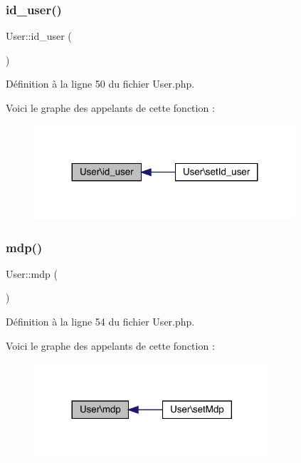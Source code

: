 \subsubsection{\texorpdfstring{id\+\_\+user()}{id\_user()}}
{\footnotesize\ttfamily User\+::id\+\_\+user (\begin{DoxyParamCaption}{ }\end{DoxyParamCaption})}



Définition à la ligne 50 du fichier User.\+php.

Voici le graphe des appelants de cette fonction \+:\nopagebreak
\begin{figure}[H]
\begin{center}
\leavevmode
\includegraphics[width=275pt]{class_user_acca0b7b0795d518d884a25505add943c_icgraph}
\end{center}
\end{figure}
\mbox{\label{class_user_a11525bb64e691e68ccb43856433f5e71}} 
\subsubsection{\texorpdfstring{mdp()}{mdp()}}
{\footnotesize\ttfamily User\+::mdp (\begin{DoxyParamCaption}{ }\end{DoxyParamCaption})}



Définition à la ligne 54 du fichier User.\+php.

Voici le graphe des appelants de cette fonction \+:\nopagebreak
\begin{figure}[H]
\begin{center}
\leavevmode
\includegraphics[width=248pt]{class_user_a11525bb64e691e68ccb43856433f5e71_icgraph}
\end{center}
\end{figure}
\mbox{\label{class_user_ab341c8493decd7ed8ad872544a3b3332}} 

